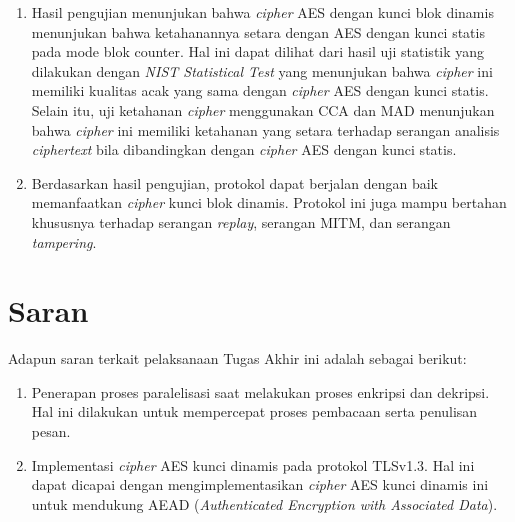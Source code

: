 \begin{enumerate}
  \item Hasil pengujian menunjukan bahwa \emph{cipher} AES dengan kunci blok dinamis menunjukan bahwa ketahanannya setara dengan AES dengan kunci statis pada mode blok counter. Hal ini dapat dilihat dari hasil uji statistik yang dilakukan dengan \emph{NIST Statistical Test} yang menunjukan bahwa \emph{cipher} ini memiliki kualitas acak yang sama dengan \emph{cipher} AES dengan kunci statis. Selain itu, uji ketahanan \emph{cipher} menggunakan CCA dan MAD menunjukan bahwa \emph{cipher} ini memiliki ketahanan yang setara terhadap serangan analisis \emph{ciphertext} bila dibandingkan dengan \emph{cipher} AES dengan kunci statis.
  \item Berdasarkan hasil pengujian, protokol dapat berjalan dengan baik memanfaatkan \emph{cipher} kunci blok dinamis. Protokol ini juga mampu bertahan khususnya terhadap serangan \emph{replay}, serangan MITM, dan serangan \emph{tampering}.
\end{enumerate}

\section{Saran}
Adapun saran terkait pelaksanaan Tugas Akhir ini adalah sebagai berikut:
\begin{enumerate}
  \item Penerapan proses paralelisasi saat melakukan proses enkripsi dan dekripsi. Hal ini dilakukan untuk mempercepat proses pembacaan serta penulisan pesan.
  \item Implementasi \emph{cipher} AES kunci dinamis pada protokol TLSv1.3. Hal ini dapat dicapai dengan mengimplementasikan \emph{cipher} AES kunci dinamis ini untuk mendukung AEAD (\emph{Authenticated Encryption with Associated Data}).
\end{enumerate}
